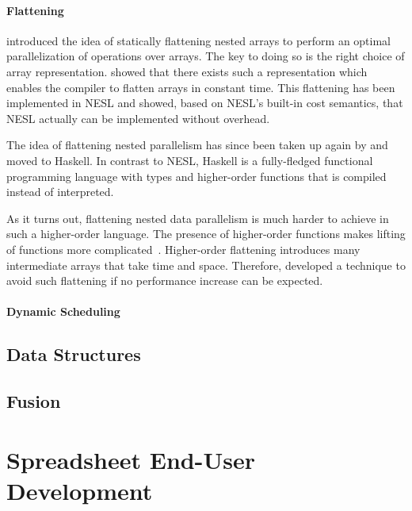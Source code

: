 \documentclass[a4paper]{article}
\begin{document}
\paragraph{Flattening}

\citet{Blelloch1993Implementation} introduced the idea of statically
flattening nested arrays to perform an optimal parallelization of
operations over arrays. The key to doing so is the right choice of
array representation. \citet{Blelloch1993Implementation} showed that
there exists such a representation which enables the compiler to
flatten arrays in constant time. This flattening has been implemented
in NESL and \citet{Blelloch:1996:PTS:232627.232650} showed, based on
NESL's built-in cost semantics, that NESL actually can be implemented
without overhead.

The idea of flattening nested parallelism has since been taken up
again by \citet{Lippmeier:2012:WEH:2364527.2364564} and moved to
Haskell. In contrast to NESL, Haskell is a fully-fledged functional
programming language with types and higher-order functions that is
compiled instead of interpreted.

As it turns out, flattening nested data parallelism is much harder to
achieve in such a higher-order language. The presence of higher-order
functions makes lifting of functions more
complicated~\cite{Lippmeier:2012:WEH:2364527.2364564}. Higher-order
flattening introduces many intermediate arrays that take time and
space. Therefore, \citet{Keller:2012:VA:2364506.2364512} developed a
technique to avoid such flattening if no performance increase can be
expected.

\paragraph{Dynamic Scheduling}


\subsection{Data Structures}
\label{sec:data-structures}

\subsection{Fusion}
\label{sec:fusion}


\section{Spreadsheet End-User Development}
\label{sec:spreadsheet-end-user-dev}




\end{document}
